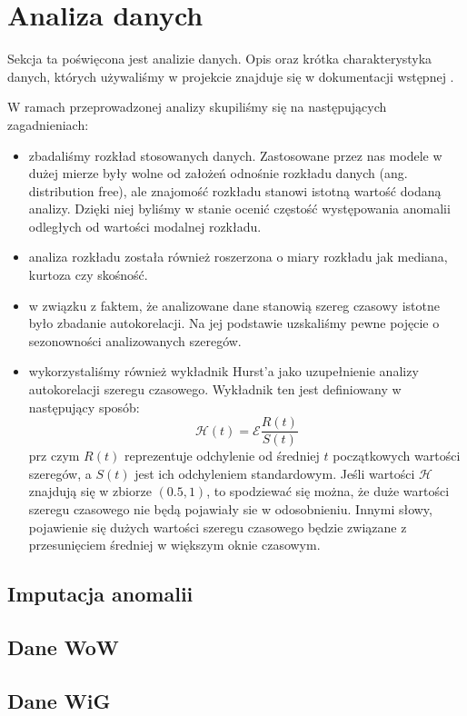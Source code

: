 \section{Analiza danych}
\label{section:analiza}

Sekcja ta poświęcona jest analizie danych. Opis oraz krótka charakterystyka danych, których używaliśmy w projekcie znajduje się w dokumentacji wstępnej \cite{Dzienisz}. 

W ramach przeprowadzonej analizy skupiliśmy się na następujących zagadnieniach:

\begin{itemize}

  \item zbadaliśmy rozkład stosowanych danych. Zastosowane przez nas modele w dużej mierze były wolne od założeń odnośnie rozkładu danych (ang. distribution free), ale znajomość
  rozkładu stanowi istotną wartość dodaną analizy. Dzięki niej byliśmy w stanie ocenić częstość występowania anomalii odległych od wartości modalnej rozkładu. 
  \item analiza rozkładu została również roszerzona o miary rozkładu jak mediana, kurtoza czy skośność. 
  \item w związku z faktem, że analizowane dane stanowią szereg czasowy istotne było zbadanie autokorelacji. Na jej podstawie uzskaliśmy pewne pojęcie o sezonowności
  analizowanych szeregów.
  \item wykorzystaliśmy również wykładnik Hurst'a jako uzupełnienie analizy autokorelacji szeregu czasowego. Wykładnik ten jest definiowany w następujący sposób:
    \begin{equation}
        \mathcal{H}(t) = \mathcal{E}\frac{R(t)}{S(t)}
    \end{equation}
    prz czym $R(t)$ reprezentuje odchylenie od średniej $t$ początkowych wartości szeregów, a $S(t)$ jest ich odchyleniem standardowym. 
    Jeśli wartości $\mathcal{H}$ znajdują się w zbiorze $(0.5, 1)$, to spodziewać się można, że duże wartości szeregu czasowego nie będą pojawiały sie w odosobnieniu. Innymi słowy, 
    pojawienie się dużych wartości szeregu czasowego będzie związane z przesunięciem średniej w większym oknie czasowym.
\end{itemize}

\subsection{Imputacja anomalii}
\label{subsection:imputacja}


\subsection{Dane WoW}
\label{subsection:dane-wow}


\subsection{Dane WiG}
\label{subsection:dane-wig}

